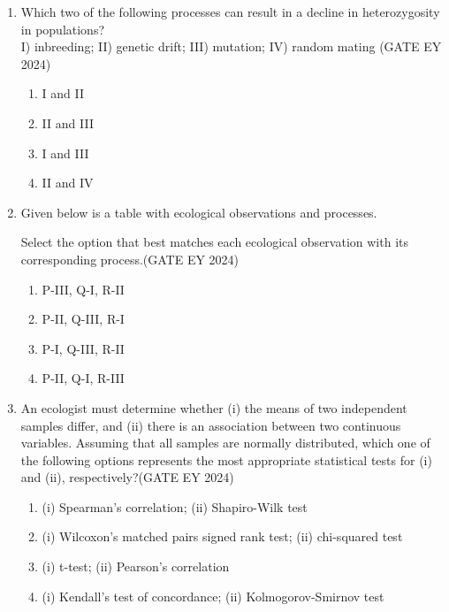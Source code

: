 \begin{enumerate}
\item Which two of the following processes can result in a decline in heterozygosity in populations? \\
I) inbreeding; II) genetic drift; III) mutation; IV) random mating \hfill{(GATE EY 2024)}
    \begin{multicols}{2}
    \begin{enumerate}
        \item I and II
        \item II and III
        \item I and III
        \item II and IV
    \end{enumerate}
    \end{multicols}

\item Given below is a table with ecological observations and processes. 


Select the option that best matches each ecological observation with its corresponding process.\hfill{(GATE EY 2024)}
    \begin{multicols}{2}
    \begin{enumerate}
        \item P-III, Q-I, R-II
        \item P-II, Q-III, R-I
        \item P-I, Q-III, R-II
        \item P-II, Q-I, R-III
    \end{enumerate}
    \end{multicols}

\item An ecologist must determine whether (i) the means of two independent samples differ, and (ii) there is an association between two continuous variables. Assuming that all samples are normally distributed, which one of the following options represents the most appropriate statistical tests for (i) and (ii), respectively?\hfill{(GATE EY 2024)}
    \begin{enumerate}
        \item (i) Spearman's correlation; (ii) Shapiro-Wilk test
        \item (i) Wilcoxon's matched pairs signed rank test; (ii) chi-squared test
        \item (i) t-test; (ii) Pearson's correlation
        \item (i) Kendall's test of concordance; (ii) Kolmogorov-Smirnov test
    \end{enumerate}


\end{enumerate}
